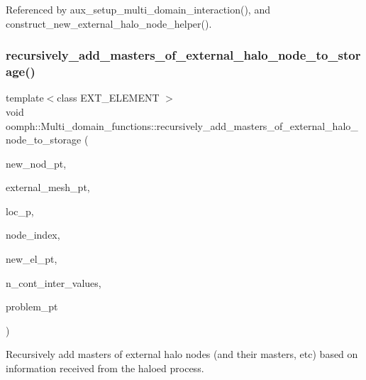 Referenced by aux\+\_\+setup\+\_\+multi\+\_\+domain\+\_\+interaction(), and construct\+\_\+new\+\_\+external\+\_\+halo\+\_\+node\+\_\+helper().

\mbox{\label{namespaceoomph_1_1Multi__domain__functions_a8eeb905c3ef62453b87a512e4c3eafdd}} 
\subsubsection{\texorpdfstring{recursively\+\_\+add\+\_\+masters\+\_\+of\+\_\+external\+\_\+halo\+\_\+node\+\_\+to\+\_\+storage()}{recursively\_add\_masters\_of\_external\_halo\_node\_to\_storage()}}
{\footnotesize\ttfamily template$<$class E\+X\+T\+\_\+\+E\+L\+E\+M\+E\+NT $>$ \\
void oomph\+::\+Multi\+\_\+domain\+\_\+functions\+::recursively\+\_\+add\+\_\+masters\+\_\+of\+\_\+external\+\_\+halo\+\_\+node\+\_\+to\+\_\+storage (\begin{DoxyParamCaption}\item[{\hyperlink{classoomph_1_1Node}{Node} $\ast$\&}]{new\+\_\+nod\+\_\+pt,  }\item[{\hyperlink{classoomph_1_1Mesh}{Mesh} $\ast$const \&}]{external\+\_\+mesh\+\_\+pt,  }\item[{unsigned \&}]{loc\+\_\+p,  }\item[{unsigned \&}]{node\+\_\+index,  }\item[{\hyperlink{classoomph_1_1FiniteElement}{Finite\+Element} $\ast$const \&}]{new\+\_\+el\+\_\+pt,  }\item[{int \&}]{n\+\_\+cont\+\_\+inter\+\_\+values,  }\item[{\hyperlink{classoomph_1_1Problem}{Problem} $\ast$}]{problem\+\_\+pt }\end{DoxyParamCaption})}



Recursively add masters of external halo nodes (and their masters, etc) based on information received from the haloed process. 

